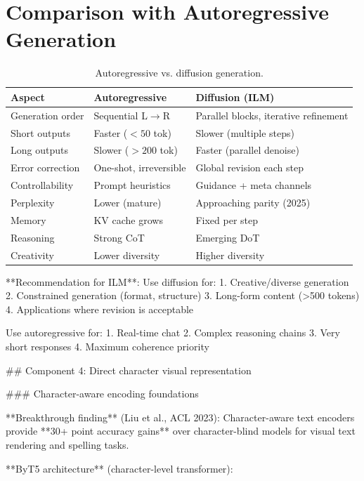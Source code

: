 \documentclass[11pt]{article}
\begin{document}
\section{Comparison with Autoregressive Generation}
\begin{table}[h]
  \centering
  \renewcommand{\arraystretch}{1.15}
  \begin{tabularx}{\linewidth}{@{} l XX @{} }
    \toprule
    Aspect & Autoregressive & Diffusion (ILM) \\
    \midrule
    Generation order & Sequential L$\to$R & Parallel blocks, iterative refinement \\
    Short outputs & Faster ($<50$ tok) & Slower (multiple steps) \\
    Long outputs & Slower ($>200$ tok) & Faster (parallel denoise) \\
    Error correction & One-shot, irreversible & Global revision each step \\
    Controllability & Prompt heuristics & Guidance + meta channels \\
    Perplexity & Lower (mature) & Approaching parity (2025) \\
    Memory & KV cache grows & Fixed per step \\
    Reasoning & Strong CoT & Emerging DoT \\
    Creativity & Lower diversity & Higher diversity \\
    \bottomrule
  \end{tabularx}
  \vspace{-6pt}
  \caption{Autoregressive vs. diffusion generation.}
\end{table}

**Recommendation for ILM**: Use diffusion for:
1. Creative/diverse generation
2. Constrained generation (format, structure)
3. Long-form content (>500 tokens)
4. Applications where revision is acceptable

Use autoregressive for:
1. Real-time chat
2. Complex reasoning chains
3. Very short responses
4. Maximum coherence priority

## Component 4: Direct character visual representation

### Character-aware encoding foundations

**Breakthrough finding** (Liu et al., ACL 2023): Character-aware text encoders provide **30+ point accuracy gains** over character-blind models for visual text rendering and spelling tasks.

**ByT5 architecture** (character-level transformer):
\end{document}
